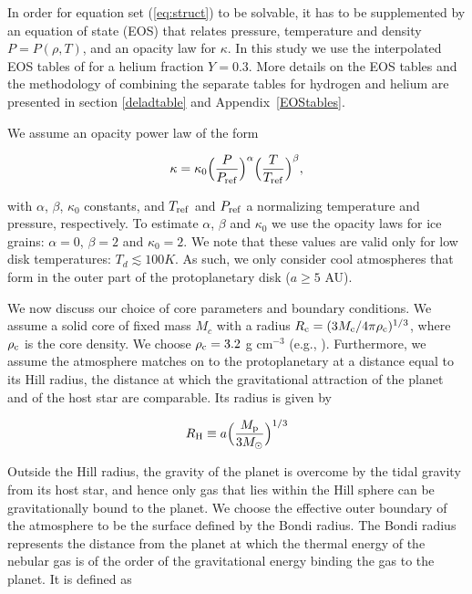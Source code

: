 \documentclass[apj]{emulateapj}
\newcommand{\App}[1]{Appendix~\ref{#1}}
\begin{document}
In order for equation set (\ref{eq:struct}) to be solvable, it has to be supplemented by an equation of state (EOS) that relates pressure, temperature and density $P=P(\rho, T)$, and an opacity law for $\kappa$. In this study we use the interpolated EOS tables of \citet{saumon95} for a helium fraction $Y=0.3$. More details on the EOS tables and the methodology of combining the separate tables for hydrogen and helium are presented in section \ref{deladtable} and \App{EOStables}.

We assume an opacity power law of the form

\begin{equation}
\label{eq:opacitylaw}
\kappa=\kappa_0 \Big(\frac{P}{P_{\rm{ref}}}\Big)^{\alpha} \Big(\frac{T}{T_{\rm{ref}}}\Big)^{\beta},
\end{equation}  

\noindent with $\alpha$, $\beta$, $\kappa_0$ constants, and $T_{\rm{ref}}$ and $P_{\rm{ref}}$ a normalizing temperature and pressure, respectively. To estimate $\alpha$, $\beta$ and $\kappa_0$ we use the \citet{bell94} opacity laws for ice grains: $\alpha =0 $, $\beta=2$ and $\kappa_0=2$. We note that these values are valid only for low disk temperatures: $T_d \lesssim 100 K$. As such, we only consider cool atmospheres that form in the outer part of the protoplanetary disk ($a \geq 5$ AU).



We now discuss our choice of core parameters and boundary conditions. We assume a solid core of fixed mass $M_c$ with a radius $R_{\rm c}=(3 M_{\rm c}/4 \pi \rho_{\rm c})^{1/3}$, where $\rho_{\rm c}$ is the core density. We choose $\rho_{\rm c}=3.2$ g cm$^{-3}$ (e.g., \citealt{pap99}). Furthermore, we assume the atmosphere matches on to the protoplanetary at a distance equal to its Hill radius, the distance at which the gravitational attraction of the planet and of the host star are comparable. Its radius is given by

\begin{equation}
\label{eq:RHill}
R_{\rm H} \equiv a \Big(\frac{M_{\rm p}}{3 M_{\odot}}\Big)^{1/3}
\end{equation}

\noindent Outside the Hill radius, the gravity of the planet is overcome by the tidal gravity from its host star, and hence only gas that lies within the Hill sphere can be gravitationally bound to the planet. We choose the effective outer boundary of the atmosphere to be the surface defined by the Bondi radius. The Bondi radius represents the distance from the planet at which the thermal energy of the nebular gas is of the order of the gravitational energy binding the gas to the planet. It is defined as
\end{document}
